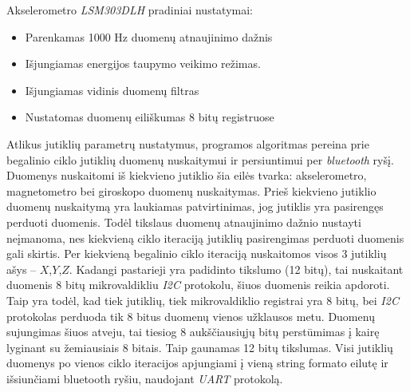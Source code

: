 \documentclass[]{vgtuef}
\begin{document}
Akselerometro \textit{LSM303DLH} pradiniai nustatymai:
\begin{itemize}
\item Parenkamas 1000 Hz duomenų atnaujinimo dažnis
\item Išjungiamas energijos taupymo veikimo režimas.
\item Išjungiamas vidinis duomenų filtras 
\item Nustatomas duomenų eiliškumas 8 bitų registruose
\end{itemize}

Atlikus jutiklių parametrų nustatymus, programos algoritmas pereina prie begalinio ciklo jutiklių duomenų nuskaitymui ir persiuntimui per \textit{bluetooth} ryšį. Duomenys nuskaitomi iš kiekvieno jutiklio šia eilės tvarka: akselerometro, magnetometro bei giroskopo duomenų nuskaitymas. Prieš kiekvieno jutiklio duomenų nuskaitymą yra laukiamas patvirtinimas, jog jutiklis yra pasirengęs perduoti duomenis. Todėl tikslaus duomenų atnaujinimo dažnio nustayti neįmanoma, nes kiekvieną ciklo iteraciją jutiklių pasirengimas perduoti duomenis gali skirtis. Per kiekvieną begalinio ciklo iteraciją nuskaitomos visos 3 jutiklių ašys – $X$,$Y$,$Z$. Kadangi pastarieji yra padidinto tikslumo (12 bitų), tai nuskaitant duomenis 8 bitų mikrovaldikliu \textit{I2C} protokolu, šiuos duomenis reikia apdoroti. Taip yra todėl, kad tiek jutiklių, tiek mikrovaldiklio registrai yra 8 bitų, bei \textit{I2C} protokolas perduoda tik 8 bitus duomenų vienos užklausos metu. Duomenų sujungimas šiuos atveju, tai tiesiog 8 aukščiausiųjų bitų perstūmimas į kairę lyginant su žemiausiais 8 bitais. Taip gaunamas 12 bitų tikslumas. Visi jutiklių duomenys po vienos ciklo iteracijos apjungiami į vieną string formato eilutę ir išsiunčiami bluetooth ryšiu, naudojant \textit{UART} protokolą. 
\end{document}
